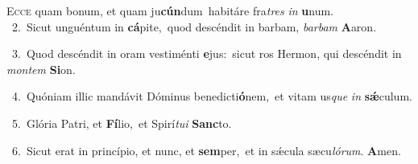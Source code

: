 \lettrine{\initial\textcolor{\initialcolor}{E}}{cce} quam bonum, et quam ju\-\textbf{cún}\-dum~\star habitáre fra\textit{tres} \textit{in} \textbf{u}\-num.\\
{\numbfont\textcolor{\numbcolor}{~2.}}~Sicut unguéntum in \textbf{cá}\-pite,~\star quod descéndit in barbam, \textit{bar}\-\textit{bam} \textbf{A}\-aron.\par
{\numbfont\textcolor{\numbcolor}{~3.}}~Quod descéndit in oram vestiménti \textbf{e}\-jus:~\star sicut ros Hermon, qui descéndit in \textit{mon}\-\textit{tem} \textbf{Si}\-on.\par
{\numbfont\textcolor{\numbcolor}{~4.}}~Quóniam illic mandávit Dóminus benedicti\-\textbf{ó}\-nem,~\star et vitam us\textit{que} \textit{in} \textbf{sǽ}\-culum.\par
{\numbfont\textcolor{\numbcolor}{~5.}}~Glória Patri, et \textbf{Fí}\-lio,~\star et Spirí\-\textit{tu}\-\textit{i} \textbf{Sanc}\-to.\par
{\numbfont\textcolor{\numbcolor}{~6.}}~Sicut erat in princípio, et nunc, et \textbf{sem}\-per,~\star et in sǽcula sæcu\-\textit{ló}\-\textit{rum}. \textbf{A}\-men.\par
